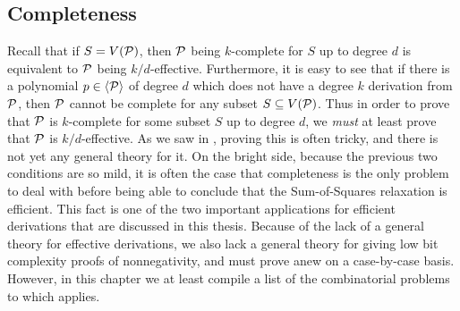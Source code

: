\subsection{Completeness}
Recall that if $S = V(\mathcal P)$, then $\mathcal P$ being $k$-complete for $S$ up to degree $d$ is equivalent to $\mathcal P$ being $k/d$-effective. Furthermore, it is easy to see that if there is a polynomial $p \in \langle \mathcal P \rangle$ of degree $d$ which does not have a degree $k$ derivation from $\mathcal P$, then $\mathcal P$ cannot be complete for any subset $S \subseteq V(\mathcal P)$. Thus in order to prove that $\mathcal P$ is $k$-complete for some subset $S$ up to degree $d$, we \emph{must} at least prove that $\mathcal P$ is $k/d$-effective. As we saw in , proving this is often tricky, and there is not yet any general theory for it. On the bright side, because the previous two conditions are so mild, it is often the case that completeness is the only problem to deal with before being able to conclude that the Sum-of-Squares relaxation is efficient. This fact is one of the two important applications for efficient derivations that are discussed in this thesis. Because of the lack of a general theory for effective derivations, we also lack a general theory for giving low bit complexity proofs of nonnegativity, and must prove anew on a case-by-case basis. However, in this chapter we at least compile a list of the combinatorial problems to which  applies.

